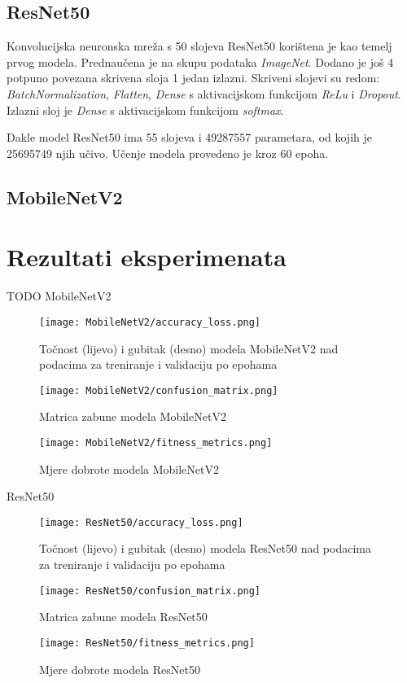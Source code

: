 \documentclass[conference, utf8]{IEEEtran}
\begin{document}
\subsection{ResNet50}
Konvolucijska neuronska mreža s 50 slojeva ResNet50 korištena je kao temelj prvog modela. Prednaučena je na skupu podataka \textit{ImageNet}. Dodano je još 4 potpuno povezana skrivena sloja 1 jedan izlazni. Skriveni slojevi su redom: \textit{BatchNormalization}, \textit{Flatten}, \textit{Dense} s aktivacijskom funkcijom \textit{ReLu} i \textit{Dropout}. Izlazni sloj je \textit{Dense} s aktivacijskom funkcijom \textit{softmax}.

Dakle model ResNet50 ima 55 slojeva i 49287557 parametara, od kojih je 25695749 njih učivo. Učenje modela provedeno je kroz 60 epoha.


\subsection{MobileNetV2}


\section{Rezultati eksperimenata}
TODO
MobileNetV2
\begin{figure}[ht]
  \centering
  \texttt{[image: MobileNetV2/accuracy\_loss.png]}
  \caption{Točnost (lijevo) i gubitak (desno) modela MobileNetV2 nad podacima za treniranje i validaciju po epohama}
  \label{fig:MN_acc_loss}
\end{figure}
\begin{figure}[ht]
  \centering
  \texttt{[image: MobileNetV2/confusion\_matrix.png]}
  \caption{Matrica zabune modela MobileNetV2}
  \label{fig:MN_conf_mat}
\end{figure}
\begin{figure}[ht]
  \centering
  \texttt{[image: MobileNetV2/fitness\_metrics.png]}
  \caption{Mjere dobrote modela MobileNetV2}
  \label{fig:MN_fit_met}
\end{figure}

ResNet50
\begin{figure}[ht]
  \centering
  \texttt{[image: ResNet50/accuracy\_loss.png]}
  \caption{Točnost (lijevo) i gubitak (desno) modela ResNet50 nad podacima za treniranje i validaciju po epohama}
  \label{fig:RN50_acc_loss}
\end{figure}
\begin{figure}[ht]
  \centering
  \texttt{[image: ResNet50/confusion\_matrix.png]}
  \caption{Matrica zabune modela ResNet50}
  \label{fig:RN50_conf_mat}
\end{figure}
\begin{figure}[ht]
  \centering
  \texttt{[image: ResNet50/fitness\_metrics.png]}
  \caption{Mjere dobrote modela ResNet50}
  \label{fig:RN50_fit_met}
\end{figure}
\end{document}
